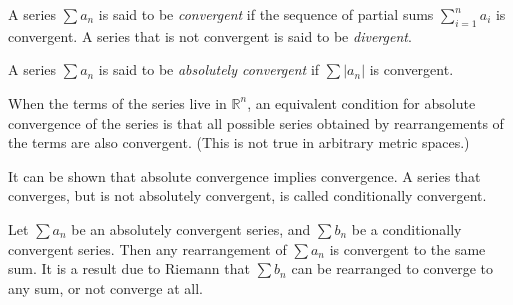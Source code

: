 \documentclass[12pt]{article}
\def\R{\mathbb{R}}
\begin{document}
A series $\sum a_n$ is said to be \emph{convergent}
if the sequence of partial sums $\sum_{i=1}^n a_i$ is convergent.
A series that is not convergent is said to be \emph{divergent}.

A series $\sum a_n$ is said to be \emph{absolutely convergent}
if $\sum |a_n|$ is convergent.

When the terms of the series live in $\R^n$,
an equivalent condition for absolute convergence of the series
is that all possible series obtained by rearrangements
of the terms are also convergent.
(This is not true in arbitrary metric spaces.)

It can be shown that absolute convergence implies convergence.
A series that converges, but is not absolutely convergent,
is called conditionally convergent.

Let $\sum a_n$ be an absolutely convergent series,
and $\sum b_n$ be a conditionally convergent series.
Then any rearrangement of $\sum a_n$ is convergent to the same sum.
It is a result due to Riemann that $\sum b_n$
can be rearranged to converge to any sum, or not converge at all.

\end{document}
